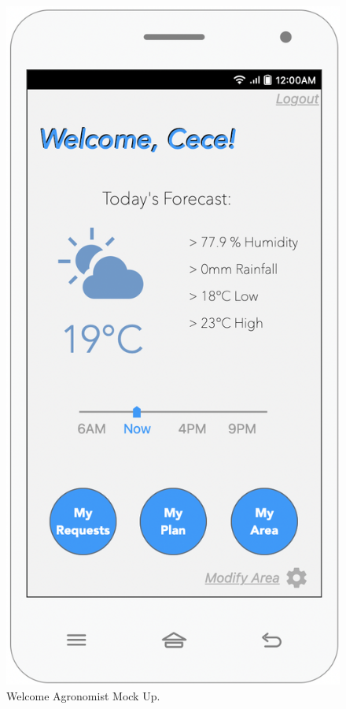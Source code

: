 \begin{multicols}{3}
 
\begin{figure}[H]
 \centering
\includegraphics[scale=0.35]{../images_diagrams/mock_ups/welcomeagro100.png}
 \caption{\label{fig:mock_agronomist}Welcome Agronomist Mock Up.}
 \end{figure}
 

\end{multicols}

